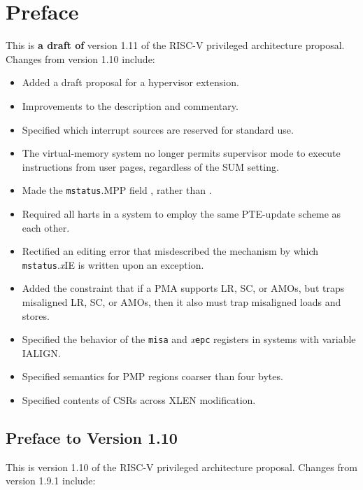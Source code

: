 \chapter{Preface}

This is {\bf a draft of} version 1.11 of the RISC-V privileged
architecture proposal.  Changes from version 1.10 include:

\begin{itemize}
  \parskip 0pt
  \itemsep 1pt
\item Added a draft proposal for a hypervisor extension.
\item Improvements to the description and commentary.
\item Specified which interrupt sources are reserved for standard use.
\item The virtual-memory system no longer permits supervisor mode to execute
  instructions from user pages, regardless of the SUM setting.
\item Made the {\tt mstatus}.MPP field \warl, rather than \wlrl.
\item Required all harts in a system to employ the same PTE-update scheme as each other.
\item Rectified an editing error that misdescribed the mechanism by which
  {\tt mstatus}.{\em x}IE is written upon an exception.
\item Added the constraint that if a PMA supports LR, SC, or AMOs, but traps
  misaligned LR, SC, or AMOs, then it also must trap
  misaligned loads and stores.
\item Specified the behavior of the {\tt misa} and {\em x}{\tt epc} registers in
  systems with variable IALIGN.
\item Specified semantics for PMP regions coarser than four bytes.
\item Specified contents of CSRs across XLEN modification.
\end{itemize}

\newpage

\section*{Preface to Version 1.10}

This is version 1.10 of the RISC-V privileged
architecture proposal.  Changes from version 1.9.1 include:

